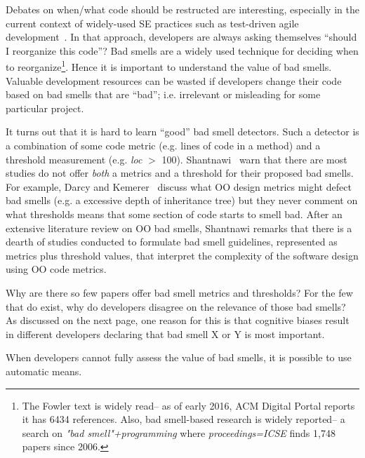 \documentclass{sig-alternate}
\begin{document}
Debates on when/what code should be restructed are interesting, especially
in the current context of  widely-used SE practices such as
test-driven agile development~\cite{beck2003test,janzen05,williams2003test,george2003initial}.
In that approach, developers are always asking themselves ``should I reorganize this code''?
Bad smells are a widely used  technique for deciding when to reorganize\footnote{The Fowler text is widely read-- as of  early 2016, ACM Digital Portal reports 
it has 6434 references. Also, bad smell-based research
is widely reported-- a search  on {\em "bad smell"+programming} 
where {\em proceedings=ICSE} finds 1,748 papers since 2006.}.
Hence it is important to understand the value of
 bad smells.  
Valuable development resources can be wasted if developers
change their code based on   bad smells that are ``bad''; i.e. 
 irrelevant or misleading
for some particular project.
 

It turns out that it is hard to learn ``good'' bad smell detectors. Such a detector
is a combination of some code metric (e.g. lines of code in a method)
and a threshold measurement (e.g. {\em loc} $>$ 100). 
Shantnawi~\cite{Shatnawi10} warn that  there are most  studies do not offer
{\em both} a metrics and a threshold for their proposed bad smells. For example,  Darcy and Kemerer~\cite{darcy05}
discuss what OO design metrics might defect bad smells (e.g. a excessive
depth of inheritance tree) but they never comment on what thresholds
means that some section of code starts to smell bad. After
an extensive literature review on OO bad smells, Shantnawi remarks that there is a dearth
of  studies  conducted to formulate bad smell guidelines,
represented as metrics plus threshold values, that interpret the complexity of the software design using OO code metrics. 

Why are there so few papers offer bad smell metrics and thresholds? For the few that
do exist, why do developers disagree on the relevance of those bad smells?
As discussed on the next page, one reason for this is that 
   cognitive biases result in different
developers declaring that
bad smell X or Y is most important. 

When developers cannot fully assess the value of bad smells,
it is possible to use automatic means. 
\end{document}
